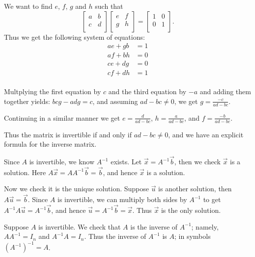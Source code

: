 \documentclass[12pt,letterpaper]{article}
\begin{document}
\begin{enumerate}
\begin{enumerate}
\end{enumerate}
    
\Answer We want to find $e$, $f$, $g$ and $h$ such that 
$$\begin{bmatrix}
a & b\\
c & d\\
\end{bmatrix}\begin{bmatrix}
e & f\\
g &h\\
\end{bmatrix}=\begin{bmatrix}
1 & 0\\
0 & 1\\
\end{bmatrix}.$$
Thus we get the following system of equations:
\begin{align*}
ae+gb&=1\\
af+bh&=0\\
ce+dg&=0\\
cf+dh&=1\\
\end{align*}

Multplying the first equation by $c$ and the third equation by $-a$ and adding them together yields: $bcg-adg=c$, and assuming $ad-bc\neq0$, we get $g=\frac{-c}{ad-bc}$.

Continuing in a similar manner we get $e=\frac{d}{ad-bc}$, $h=\frac{a}{ad-bc}$, and $f=\frac{-b}{ad-bc}$.

Thus the matrix is invertible if and only if $ad-bc\neq0$, and we have an explicit formula for the inverse matrix.
  
\Answer Since $A$ is invertible, we know $A^{-1}$ exists. Let $\vec{x}=A^{-1}\vec{b}$, then we check $\vec{x}$ is a solution. Here $A\vec{x}=AA^{-1}\vec{b}=\vec{b}$, and hence $\vec{x}$ is a solution.

Now we check it is the unique solution. Suppose $\vec{u}$ is another solution, then $A\vec{u}=\vec{b}$. Since $A$ is invertible, we can multiply both sides by $A^{-1}$ to get $A^{-1}A\vec{u}=A^{-1}\vec{b}$, and hence $\vec{u}=A^{-1}\vec{b}=\vec{x}$. Thus $\vec{x}$ is the only solution.
  
\Answer 

\begin{enumerate}
	
\Part Suppose $A$ is invertible. We check that $A$ is the inverse of $A^{-1}$; namely, $AA^{-1}=I_n$ and $A^{-1}A=I_n$. Thus the inverse of $A^{-1}$ is $A$; in symbols $(A^{-1})^{-1}=A$.


\end{enumerate}
\end{enumerate}
\end{document}
